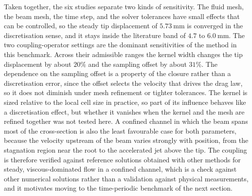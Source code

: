 \noindent
Taken together, the six studies separate two kinds of sensitivity. The fluid mesh, the beam mesh, the time step, and the solver tolerances have small effects that can be controlled, so the steady tip displacement of $5.73~\mathrm{mm}$ is converged in the discretisation sense, and it stays inside the literature band of $4.7$ to $6.0~\mathrm{mm}$. The two coupling-operator settings are the dominant sensitivities of the method in this benchmark. Across their admissible ranges the kernel width changes the tip displacement by about $20\%$ and the sampling offset by about $31\%$. The dependence on the sampling offset is a property of the closure rather than a discretisation error, since the offset selects the velocity that drives the drag law, so it does not diminish under mesh refinement or tighter tolerances. The kernel is sized relative to the local cell size in practice, so part of its influence behaves like a discretisation effect, but whether it vanishes when the kernel and the mesh are refined together was not tested here. A confined channel in which the beam spans most of the cross-section is also the least favourable case for both parameters, because the velocity upstream of the beam varies strongly with position, from the stagnation region near the root to the accelerated jet above the tip. The coupling is therefore verified against reference solutions obtained with other methods for steady, viscous-dominated flow in a confined channel, which is a check against other numerical solutions rather than a validation against physical measurements, and it motivates moving to the time-periodic benchmark of the next section.
